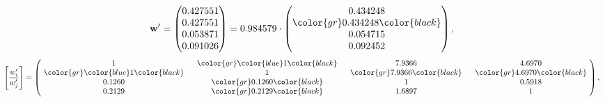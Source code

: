 \begin{example}
\begin{equation*}
\mathbf{w}^{\prime} =
\begin{pmatrix}
0.427551\\
0.427551\\
0.053871\\
0.091026
\end{pmatrix} =
0.984579\cdot
\begin{pmatrix}
0.434248\\
\color{gr} 0.434248\color{black} \\
0.054715\\
0.092452
\end{pmatrix},
\end{equation*}
\begin{equation*}
\left[ \frac{{w}^{\prime}_i}{{w}^{\prime}_j} \right] =
\begin{pmatrix}
$\,\,$ 1 $\,\,$ & $\,\,$\color{gr} \color{blue} 1\color{black} $\,\,$ & $\,\,$7.9366$\,\,$ & $\,\,$4.6970$\,\,$ \\
$\,\,$\color{gr} \color{blue} 1\color{black} $\,\,$ & $\,\,$ 1 $\,\,$ & $\,\,$\color{gr} 7.9366\color{black} $\,\,$ & $\,\,$\color{gr} 4.6970\color{black}   $\,\,$ \\
$\,\,$0.1260$\,\,$ & $\,\,$\color{gr} 0.1260\color{black} $\,\,$ & $\,\,$ 1 $\,\,$ & $\,\,$0.5918 $\,\,$ \\
$\,\,$0.2129$\,\,$ & $\,\,$\color{gr} 0.2129\color{black} $\,\,$ & $\,\,$1.6897$\,\,$ & $\,\,$ 1  $\,\,$ \\
\end{pmatrix},
\end{equation*}
\end{example}
\newpage
